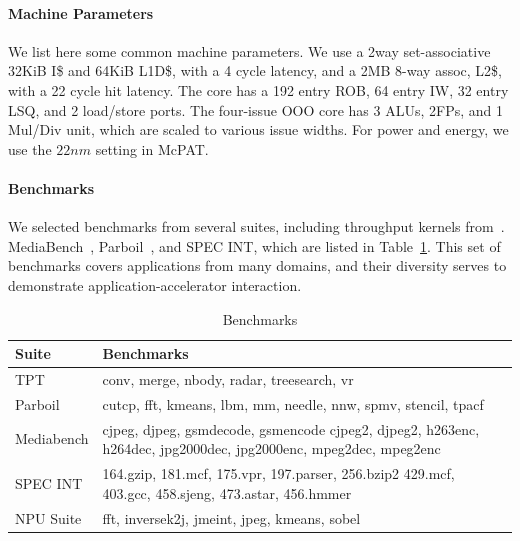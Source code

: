 \paragraph{Machine Parameters}
We list here some common machine parameters. We use a 2way set-associative 32KiB I\$ and 
64KiB L1D\$, with a 4 cycle latency, and a 2MB 8-way assoc, L2\$, with a 22 cycle hit latency.  
The core has a 192 entry ROB, 64 entry IW, 32 entry LSQ, and 2 load/store ports.
The four-issue OOO core has 3 ALUs, 2FPs, and 1 Mul/Div unit, 
which are scaled to various issue widths.
For power and energy, we use the $22nm$ setting in McPAT.  

\paragraph{Benchmarks}
We selected benchmarks from several suites, including throughput
kernels from~\cite{ieeemicro12:dyser}.
MediaBench~\cite{645830}, Parboil~\cite{parboil}, and SPEC INT,
which are listed in Table~\ref{tab:benchmarks}.  
This set of benchmarks covers applications from many domains, and
their diversity serves to demonstrate application-accelerator interaction.

\begin{table}
\footnotesize
\begin{center}
\def\arraystretch{0.95}
\setlength{\tabcolsep}{.19em}

    \begin{tabular}{l>{\RaggedRight}p{4.0in}}  \toprule
    \textbf{Suite} & \textbf{Benchmarks} \\ \midrule
    TPT & 
      conv,  merge,  nbody,  radar,  treesearch,  vr \\ 
    Parboil & 
      cutcp,  fft,  kmeans,  lbm,  mm,  needle,  nnw,  spmv,  stencil,  tpacf\\ 
    Mediabench & 
      cjpeg,  djpeg,  gsmdecode,  gsmencode   cjpeg2,  djpeg2,  h263enc,  h264dec,  jpg2000dec,  jpg2000enc,  mpeg2dec,  mpeg2enc  \\ 
    SPEC INT & 
      164.gzip,  181.mcf,  175.vpr,  197.parser,  256.bzip2   429.mcf,  403.gcc,  458.sjeng,  473.astar,  456.hmmer \\ 
    NPU Suite & 
      fft, inversek2j, jmeint, jpeg, kmeans, sobel\\ 

\bottomrule
  \end{tabular}
\end{center}
\vspace{-0.2in}

  \caption{Benchmarks}
  \label{tab:benchmarks}
\end{table}




